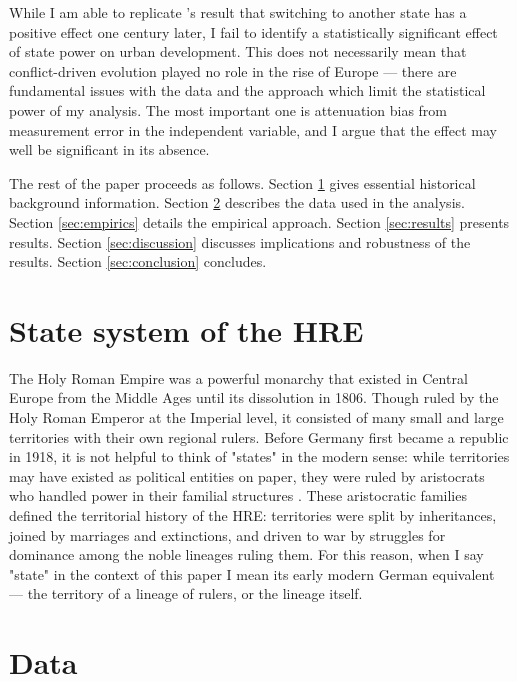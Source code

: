 \documentclass[11pt, a4paper]{article}
\begin{document}
While I am able to replicate \cite{schoenholzer2022}'s result that switching to another state has a positive effect one century later, I fail to identify a statistically significant effect of state power on urban development. This does not necessarily mean that conflict-driven evolution played no role in the rise of Europe --- there are fundamental issues with the data and the approach which limit the statistical power of my analysis. The most important one is attenuation bias from measurement error in the independent variable, and I argue that the effect may well be significant in its absence.

The rest of the paper proceeds as follows. Section \ref{sec:background} gives essential historical background information. Section \ref{sec:data} describes the data used in the analysis. Section \ref{sec:empirics} details the empirical approach. Section \ref{sec:results} presents results. Section \ref{sec:discussion} discusses implications and robustness of the results. Section \ref{sec:conclusion} concludes.



\section{State system of the HRE} \label{sec:background}

The Holy Roman Empire was a powerful monarchy that existed in Central Europe from the Middle Ages until its dissolution in 1806. Though ruled by the Holy Roman Emperor at the Imperial level, it consisted of many small and large territories with their own regional rulers. Before Germany first became a republic in 1918, it is not helpful to think of "states" in the modern sense: while territories may have existed as political entities on paper, they were ruled by aristocrats who handled power in their familial structures \citep[pp. 2-3]{pt2}. These aristocratic families defined the territorial history of the HRE: territories were split by inheritances, joined by marriages and extinctions, and driven to war by struggles for dominance among the noble lineages ruling them. For this reason, when I say "state" in the context of this paper I mean its early modern German equivalent --- the territory of a lineage of rulers, or the lineage itself.


\section{Data} \label{sec:data}
\end{document}
